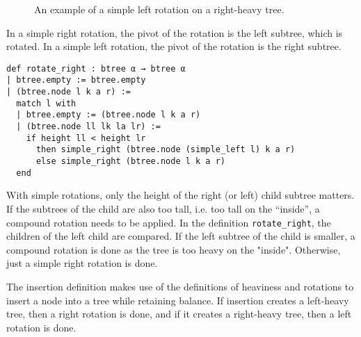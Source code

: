 \begin{figure}[!ht]
  \begin{subfigure}{0.5\textwidth}
    \centering
  \end{subfigure}%
  \begin{subfigure}{0.5\textwidth}
    \centering
  \end{subfigure}
  \label{fig:rotation}
  \caption{An example of a simple left rotation on a right-heavy tree.}
\end{figure}

In a simple right rotation, the pivot of the rotation is the left subtree, which is rotated. In a simple left rotation, the pivot of the rotation is the right subtree.

\begin{lstlisting}
def rotate_right : btree α → btree α
| btree.empty := btree.empty
| (btree.node l k a r) :=
  match l with
  | btree.empty := (btree.node l k a r)
  | (btree.node ll lk la lr) :=
    if height ll < height lr 
      then simple_right (btree.node (simple_left l) k a r)
      else simple_right (btree.node l k a r)
  end 
\end{lstlisting}

With simple rotations, only the height of the right (or left) child subtree matters. If the subtrees of the child are also too tall, i.e. too tall on the \enquote{inside}, a compound rotation needs to be applied. In the definition \lstinline{rotate_right}, the children of the left child are compared. If the left subtree of the child is smaller, a compound rotation is done as the tree is too heavy on the "inside". Otherwise, just a simple right rotation is done.

The insertion definition makes use of the definitions of heaviness and rotations to insert a node into a tree while retaining balance. If insertion creates a left-heavy tree, then a right rotation is done, and if it creates a right-heavy tree, then a left rotation is done.


